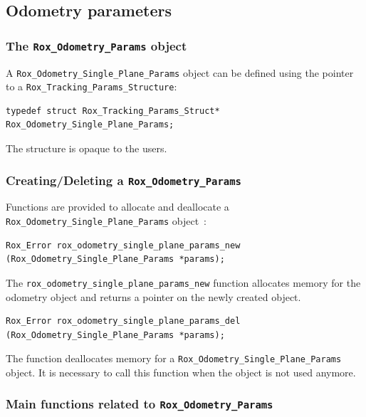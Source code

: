 \subsection{Odometry parameters}
\label{sse:odometry_single_plane_params}

\subsubsection{The {\tt Rox\_Odometry\_Params} object}
\label{sss:odometry_single_plane_params_object}

A \lstinline$Rox_Odometry_Single_Plane_Params$ object can be defined using the pointer to a \lstinline$Rox_Tracking_Params_Structure$:
\begin{lstlisting}
typedef struct Rox_Tracking_Params_Struct* Rox_Odometry_Single_Plane_Params;
\end{lstlisting}
The structure is opaque to the users.

\subsubsection{Creating/Deleting a {\tt Rox\_Odometry\_Params}}
\label{sss:odometry_single_plane_params_newdel}

Functions are provided to allocate and deallocate a \lstinline$Rox_Odometry_Single_Plane_Params$ object~:

\begin{lstlisting}
Rox_Error rox_odometry_single_plane_params_new (Rox_Odometry_Single_Plane_Params *params);
\end{lstlisting}
The \lstinline$rox_odometry_single_plane_params_new$ function allocates memory for the odometry object and returns a pointer on the newly created object.

\begin{lstlisting}
Rox_Error rox_odometry_single_plane_params_del (Rox_Odometry_Single_Plane_Params *params);
\end{lstlisting}
The function deallocates memory for a \lstinline$Rox_Odometry_Single_Plane_Params$ object. It is necessary to call this function when the object is not used anymore. \\

\subsubsection{Main functions related to {\tt Rox\_Odometry\_Params}}
\label{sss:odometry_single_plane_params_methods}


